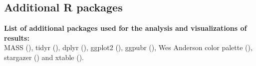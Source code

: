 \subsection{Additional R packages}
\label{app:packages}

\textbf{List of additional packages used for the analysis and visualizations of results:}\\

MASS (\cite{MASS}), tidyr (\cite{tidyr}), dplyr (\cite{dplyr}), ggplot2 (\cite{ggplot2}), ggpubr (\cite{ggpubr}), Wes Anderson color palette (\cite{wesanderson}), stargazer (\cite{stargazer}) and xtable (\cite{xtable}).